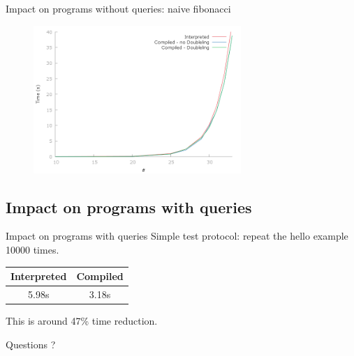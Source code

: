 \documentclass[11pt]{beamer}
\begin{document}
\begin{frame}{Impact on programs without queries: naive fibonacci}
  \begin{figure}[htbp]
    \centering
    \includegraphics[width=0.7\textwidth]{fib.png}
  \end{figure}
\end{frame}

\subsection{Impact on programs with queries}

\begin{frame}{Impact on programs with queries}
Simple test protocol: repeat the hello example 10000 times.\pause
\begin{table}[htbp]
  \centering
  \begin{tabular}{|c|c|}
    \hline
    Interpreted & Compiled \\ \hline
    5.98s & 3.18s \\ \hline
  \end{tabular}
\end{table}
This is around 47\% time reduction.
\end{frame}

\begin{frame}[plain]
\begin{center}
\Huge Questions ?
\end{center}
\end{frame}
\end{document}
